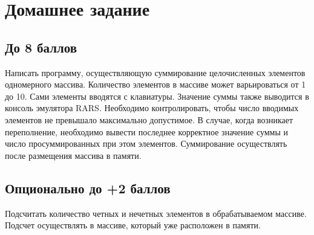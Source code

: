 \section{Домашнее задание}

\subsection{До 8 баллов}

Написать программу, осуществляющую суммирование целочисленных элементов одномерного массива. Количество элементов в массиве может варьироваться от 1 до 10. Сами элементы вводятся с клавиатуры. Значение суммы также выводится в консоль эмулятора RARS. Необходимо контролировать, чтобы число вводимых элементов не превышало максимально допустимое. В случае, когда возникает переполнение, необходимо вывести последнее корректное значение суммы и число просуммированных при этом элементов. Суммирование осуществлять после размещения массива в памяти.

\subsection{Опционально до +2 баллов}

Подсчитать количество четных и нечетных элементов в обрабатываемом массиве. Подсчет осуществлять в массиве, который уже расположен в памяти.